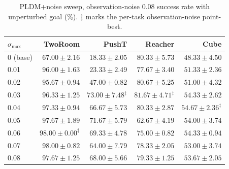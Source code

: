 \documentclass[10pt]{article}
\newcommand{\stdmax}{\ensuremath{\sigma_{\max}}}
\begin{document}
\begin{table}[H]
\centering
\caption{PLDM+noise sweep, observation-noise 0.08 success rate with unperturbed goal (\%). $\ddagger$ marks the per-task observation-noise point-best.}
\label{tab:pldm-sweep-px08}
\small
\setlength{\tabcolsep}{4pt}
\begin{tabular}{lrrrr}
\toprule
\stdmax{} & TwoRoom & PushT & Reacher & Cube \\
\midrule
0 (base)  & $67.00 \pm 2.16$ & $18.33 \pm 2.05$ & $80.33 \pm 5.73$ & $48.33 \pm 4.50$ \\
0.01     & $96.00 \pm 1.63$ & $23.33 \pm 2.49$  & $77.67 \pm 3.40$ & $51.33 \pm 2.36$ \\
0.02     & $95.67 \pm 0.94$ & $47.00 \pm 0.82$  & $80.67 \pm 5.25$ & $51.00 \pm 4.32$ \\
0.03     & $96.33 \pm 1.25$ & $73.00 \pm 7.48^{\ddagger}$ & $81.67 \pm 4.71^{\ddagger}$ & $54.33 \pm 2.62$ \\
0.04     & $97.33 \pm 0.94$ & $66.67 \pm 5.73$  & $80.33 \pm 2.87$ & $54.67 \pm 2.36^{\ddagger}$ \\
0.05     & $97.67 \pm 1.89$ & $71.67 \pm 5.79$ & $62.67 \pm 4.19$ & $54.00 \pm 3.74$ \\
0.06     & $98.00 \pm 0.00^{\ddagger}$ & $69.33 \pm 4.78$  & $75.00 \pm 0.82$ & $54.33 \pm 0.94$ \\
0.07     & $98.00 \pm 0.82$ & $64.00 \pm 7.79$  & $78.33 \pm 2.05$ & $53.00 \pm 3.74$ \\
0.08     & $97.67 \pm 1.25$ & $68.00 \pm 5.66$  & $79.33 \pm 1.25$ & $53.67 \pm 2.05$ \\
\bottomrule
\end{tabular}
\end{table}
\end{document}
